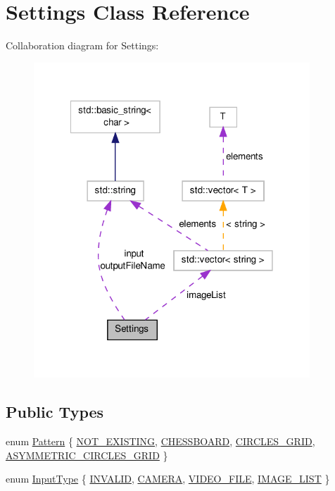\hypertarget{classSettings}{\section{Settings Class Reference}
\label{classSettings}
}


Collaboration diagram for Settings\-:\nopagebreak
\begin{figure}[H]
\begin{center}
\leavevmode
\includegraphics[width=294pt]{classSettings__coll__graph}
\end{center}
\end{figure}
\subsection*{Public Types}
\begin{DoxyCompactItemize}
\item 
enum \hyperlink{classSettings_a0e7117abd9427a6f8bc1d1d8d456b5c8}{Pattern} \{ \hyperlink{classSettings_a0e7117abd9427a6f8bc1d1d8d456b5c8ad2f421ce100bd7e0302b17bda1a74eb9}{N\-O\-T\-\_\-\-E\-X\-I\-S\-T\-I\-N\-G}, 
\hyperlink{classSettings_a0e7117abd9427a6f8bc1d1d8d456b5c8ae96aa2d60b4a554a215524a05b32908e}{C\-H\-E\-S\-S\-B\-O\-A\-R\-D}, 
\hyperlink{classSettings_a0e7117abd9427a6f8bc1d1d8d456b5c8a79472d1c69f8ed7aa1b55f908b136f68}{C\-I\-R\-C\-L\-E\-S\-\_\-\-G\-R\-I\-D}, 
\hyperlink{classSettings_a0e7117abd9427a6f8bc1d1d8d456b5c8a2cea29ee5896f2cb4cc64df25fd2375b}{A\-S\-Y\-M\-M\-E\-T\-R\-I\-C\-\_\-\-C\-I\-R\-C\-L\-E\-S\-\_\-\-G\-R\-I\-D}
 \}
\item 
enum \hyperlink{classSettings_a5afe85d24b071973a7f248c05386f7f4}{Input\-Type} \{ \hyperlink{classSettings_a5afe85d24b071973a7f248c05386f7f4adb44130895aedc32a119565eb6d61bed}{I\-N\-V\-A\-L\-I\-D}, 
\hyperlink{classSettings_a5afe85d24b071973a7f248c05386f7f4aba4cc7726878c8913831f0ea6360fa05}{C\-A\-M\-E\-R\-A}, 
\hyperlink{classSettings_a5afe85d24b071973a7f248c05386f7f4ac9fd97535bc651249f9eed1fddf2d36b}{V\-I\-D\-E\-O\-\_\-\-F\-I\-L\-E}, 
\hyperlink{classSettings_a5afe85d24b071973a7f248c05386f7f4a292bd2e5ba912a92ace1606e366edc4d}{I\-M\-A\-G\-E\-\_\-\-L\-I\-S\-T}
 \}
\end{DoxyCompactItemize}
